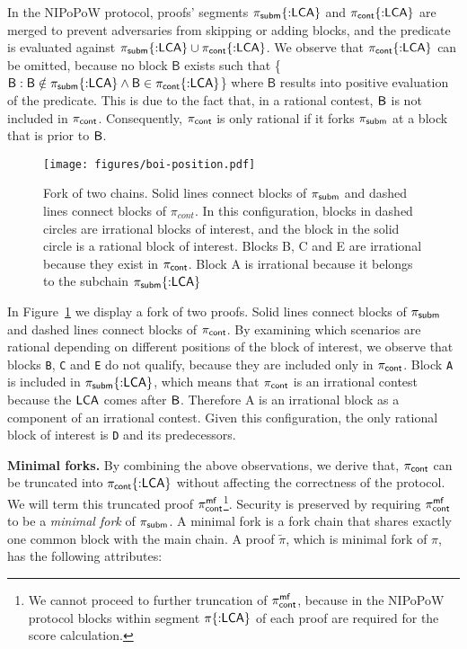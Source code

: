 \newcommand{\block}{\mathsf{B}}

In the NIPoPoW protocol, proofs' segments $\mathsf{\pi_{subm}}\{{{:}}\mathsf{LCA}\}$ and
$\mathsf{\pi_{cont}}\{{:}\mathsf{LCA}\}$ are merged to prevent adversaries from skipping or adding
blocks, and the predicate is evaluated against $\mathsf{\pi_{subm}}\{{:}\mathsf{LCA}\} \cup
\mathsf{\pi_{cont}}\{{:}\mathsf{LCA}\}$. We observe that $\mathsf{\pi_{cont}}\{{:}\mathsf{LCA}\}$ can be omitted, because no
block $\block$ exists such that \{$\block : \block \notin \pis\{{:}\lca\} \land
\block \in \pic\{{:}\lca\}$\} where $\block$ results into positive evaluation
of the predicate. This is due to the fact that, in a rational contest, $\mathsf{B}$
is not included in $\mathsf{\pi_{cont}}$. Consequently, $\mathsf{\pi_{cont}}$ is only rational if it forks
$\mathsf{\pi_{subm}}$ at a block that is prior to $\mathsf{B}$.

\renewcommand{\block}{}

\begin{figure}[h]
    \begin{center}
        \texttt{[image: figures/boi-position.pdf]}
    \end{center}
    \caption{Fork of two chains. Solid lines connect blocks of $\mathsf{\pi_{subm}}$
    and dashed lines connect blocks of $\pi_{cont}$. In this configuration,
    blocks in dashed circles are irrational blocks of interest, and the block
    in the solid circle is a rational block of interest. Blocks B, C and E are
    irrational because they exist in $\mathsf{\pi_{cont}}$. Block A is irrational because it
    belongs to the subchain $\mathsf{\pi_{subm}}\{{:}\mathsf{LCA}\}$}
    \label{fig:boi-position}
\end{figure}

In Figure~\ref{fig:boi-position} we display a fork of two proofs. Solid lines
connect blocks of $\mathsf{\pi_{subm}}$ and dashed lines connect blocks of $\mathsf{\pi_{cont}}$. By
examining which scenarios are rational depending on different positions of the
block of interest, we observe that blocks \texttt{B}, \texttt{C} and \texttt{E}
do not qualify, because they are included only in $\mathsf{\pi_{cont}}$. Block \texttt{A} is
included in $\mathsf{\pi_{subm}}\{{:}\mathsf{LCA}\}$, which means that $\mathsf{\pi_{cont}}$ is an irrational contest
because the $\mathsf{LCA}$ comes after $\mathsf{B}$. Therefore A is an irrational block as a
component of an irrational contest. Given this configuration, the only rational
block of interest is \texttt{D} and its predecessors.

\noindent \textbf{Minimal forks.} By combining the above observations, we
derive that, $\mathsf{\pi_{cont}}$ can be truncated into $\mathsf{\pi_{cont}}\{{:}\mathsf{LCA}\}$ without
affecting the correctness of the protocol. We will term this truncated proof
$\mathsf{\pi_{cont}^{mf}}$\footnote{We cannot proceed to further truncation of $\mathsf{\pi_{cont}^{mf}}$, because
in the NIPoPoW protocol blocks within segment $\pi\{{:}\mathsf{LCA}\}$ of each proof
are required for the score calculation.}. Security is preserved by requiring
$\mathsf{\pi_{cont}^{mf}}$ to be a \emph{minimal fork} of $\mathsf{\pi_{subm}}$. A minimal fork is a fork chain
that shares exactly one common block with the main chain. A proof $\tilde\pi$,
which is minimal fork of $\pi$, has the following attributes:

